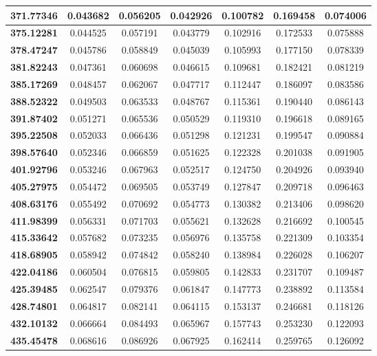 \documentclass[10pt, a4paper]{article}
\begin{document}
\begin{appendices}
\begin{longtable}{|c|c|c|c|c|c|c|}
\textbf{371.77346} & 0.043682 & 0.056205 & 0.042926 & 0.100782 & 0.169458 & 0.074006 \\ \hline
\textbf{375.12281} & 0.044525 & 0.057191 & 0.043779 & 0.102916 & 0.172533 & 0.075888 \\ \hline
\textbf{378.47247} & 0.045786 & 0.058849 & 0.045039 & 0.105993 & 0.177150 & 0.078339 \\ \hline
\textbf{381.82243} & 0.047361 & 0.060698 & 0.046615 & 0.109681 & 0.182421 & 0.081219 \\ \hline
\textbf{385.17269} & 0.048457 & 0.062067 & 0.047717 & 0.112447 & 0.186097 & 0.083586 \\ \hline
\textbf{388.52322} & 0.049503 & 0.063533 & 0.048767 & 0.115361 & 0.190440 & 0.086143 \\ \hline
\textbf{391.87402} & 0.051271 & 0.065536 & 0.050529 & 0.119310 & 0.196618 & 0.089165 \\ \hline
\textbf{395.22508} & 0.052033 & 0.066436 & 0.051298 & 0.121231 & 0.199547 & 0.090884 \\ \hline
\textbf{398.57640} & 0.052346 & 0.066859 & 0.051625 & 0.122328 & 0.201038 & 0.091905 \\ \hline
\textbf{401.92796} & 0.053246 & 0.067963 & 0.052517 & 0.124750 & 0.204926 & 0.093940 \\ \hline
\textbf{405.27975} & 0.054472 & 0.069505 & 0.053749 & 0.127847 & 0.209718 & 0.096463 \\ \hline
\textbf{408.63176} & 0.055492 & 0.070692 & 0.054773 & 0.130382 & 0.213406 & 0.098620 \\ \hline
\textbf{411.98399} & 0.056331 & 0.071703 & 0.055621 & 0.132628 & 0.216692 & 0.100545 \\ \hline
\textbf{415.33642} & 0.057682 & 0.073235 & 0.056976 & 0.135758 & 0.221309 & 0.103354 \\ \hline
\textbf{418.68905} & 0.058942 & 0.074842 & 0.058240 & 0.138984 & 0.226028 & 0.106207 \\ \hline
\textbf{422.04186} & 0.060504 & 0.076815 & 0.059805 & 0.142833 & 0.231707 & 0.109487 \\ \hline
\textbf{425.39485} & 0.062547 & 0.079376 & 0.061847 & 0.147773 & 0.238892 & 0.113584 \\ \hline
\textbf{428.74801} & 0.064817 & 0.082141 & 0.064115 & 0.153137 & 0.246681 & 0.118126 \\ \hline
\textbf{432.10132} & 0.066664 & 0.084493 & 0.065967 & 0.157743 & 0.253230 & 0.122093 \\ \hline
\textbf{435.45478} & 0.068616 & 0.086926 & 0.067925 & 0.162414 & 0.259765 & 0.126092 \\ \hline

\end{longtable}
\end{appendices}
\end{document}
